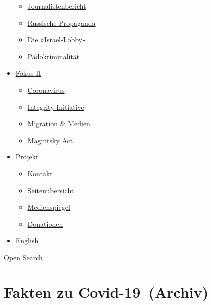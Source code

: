 \begin{itemize}
  \begin{itemize}
  \tightlist
  \item
    \href{https://swprs.org/bericht-eines-journalisten/}{Journalistenbericht}
  \item
    \href{https://swprs.org/russische-propaganda/}{Russische Propaganda}
  \item
    \href{https://swprs.org/die-israel-lobby-fakten-und-mythen/}{Die
    »Israel-Lobby«}
  \item
    \href{https://swprs.org/geopolitik-und-paedokriminalitaet/}{Pädokriminalität}
  \end{itemize}
\item
  \href{https://swprs.org/migration-und-medien/}{Fokus II}

  \begin{itemize}
  \tightlist
  \item
    \href{https://swprs.org/covid-19-hinweis-ii/}{Coronavirus}
  \item
    \href{https://swprs.org/die-integrity-initiative/}{Integrity
    Initiative}
  \item
    \href{https://swprs.org/migration-und-medien/}{Migration \& Medien}
  \item
    \href{https://swprs.org/der-fall-magnitsky/}{Magnitsky Act}
  \end{itemize}
\item
  \href{https://swprs.org/kontakt/}{Projekt}

  \begin{itemize}
  \tightlist
  \item
    \href{https://swprs.org/kontakt/}{Kontakt}
  \item
    \href{https://swprs.org/uebersicht/}{Seitenübersicht}
  \item
    \href{https://swprs.org/medienspiegel/}{Medienspiegel}
  \item
    \href{https://swprs.org/donationen/}{Donationen}
  \end{itemize}
\item
  \href{https://swprs.org/contact/}{English}
\end{itemize}

\protect\hyperlink{}{Open Search}

\hypertarget{fakten-zu-covid-19-archiv}{%
\section{Fakten zu Covid-19~(Archiv)}\label{fakten-zu-covid-19-archiv}}

